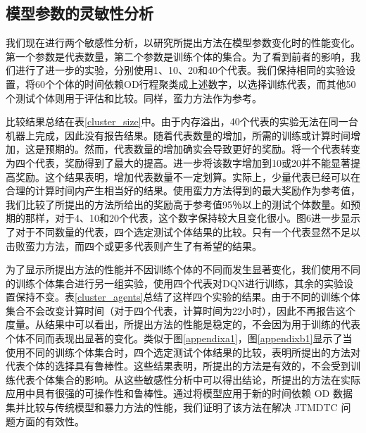 \subsection{模型参数的灵敏性分析}

我们现在进行两个敏感性分析，以研究所提出方法在模型参数变化时的性能变化。第一个参数是代表数量，第二个参数是训练个体的集合。为了看到前者的影响，我们进行了进一步的实验，分别使用1、10、20和40个代表。我们保持相同的实验设置，将60个个体的时间依赖OD行程聚类成上述数字，以选择训练代表，而其他50个测试个体则用于评估和比较。同样，蛮力方法作为参考。

比较结果总结在表\ref{cluster_size}中。由于内存溢出，40个代表的实验无法在同一台机器上完成，因此没有报告结果。随着代表数量的增加，所需的训练或计算时间增加，这是预期的。然而，代表数量的增加确实会导致更好的奖励。将一个代表转变为四个代表，奖励得到了最大的提高。进一步将该数字增加到10或20并不能显著提高奖励。这个结果表明，增加代表数量不一定划算。实际上，少量代表已经可以在合理的计算时间内产生相当好的结果。使用蛮力方法得到的最大奖励作为参考值，我们比较了所提出的方法所给出的奖励高于参考值95％以上的测试个体数量。如预期的那样，对于4、10和20个代表，这个数字保持较大且变化很小。图6进一步显示了对于不同数量的代表，四个选定测试个体结果的比较。只有一个代表显然不足以击败蛮力方法，而四个或更多代表则产生了有希望的结果。

为了显示所提出方法的性能并不因训练个体的不同而发生显著变化，我们使用不同的训练个体集合进行另一组实验，使用四个代表对DQN进行训练，其余的实验设置保持不变。表\ref{cluster_agents}总结了这样四个实验的结果。由于不同的训练个体集合不会改变计算时间（对于四个代表，计算时间为22小时），因此不再报告这个度量。从结果中可以看出，所提出方法的性能是稳定的，不会因为用于训练的代表个体不同而表现出显著的变化。类似于图\ref{appendixa1}，图\ref{appendixb1}显示了当使用不同的训练个体集合时，四个选定测试个体结果的比较，表明所提出的方法对代表个体的选择具有鲁棒性。这些结果表明，所提出的方法是有效的，不会受到训练代表个体集合的影响。从这些敏感性分析中可以得出结论，所提出的方法在实际应用中具有很强的可操作性和鲁棒性。通过将模型应用于新的时间依赖 OD 数据集并比较与传统模型和暴力方法的性能，我们证明了该方法在解决 JTMDTC 问题方面的有效性。
